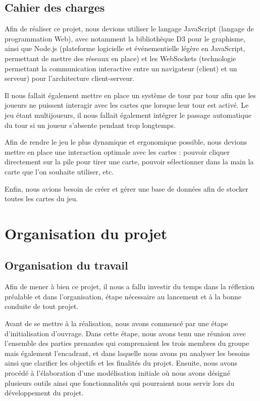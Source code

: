 \documentclass[12pt]{report}
\begin{document}
  	\section*{Cahier des charges}
  	Afin de réaliser ce projet, nous devions utiliser le langage JavaScript (langage de programmation Web), avec notamment la bibliothèque D3 pour le graphisme, ainsi que Node.js (plateforme logicielle et événementielle légère en JavaScript, permettant de mettre des réseaux en place) et les WebSockets (technologie permettant la communication interactive entre un navigateur (client) et un serveur) pour l'architecture client-serveur.

  	Il nous fallait également mettre en place un système de tour par tour afin que les joueurs ne puissent interagir avec les cartes que lorsque leur tour est activé. Le jeu étant multijoueurs, il nous fallait également intégrer le passage automatique du tour si un joueur s'absente pendant trop longtemps.

    Afin de rendre le jeu le plus dynamique et ergonomique possible, nous devions mettre en place une interaction optimale avec les cartes : pouvoir cliquer directement sur la pile pour tirer une carte, pouvoir sélectionner dans la main la carte que l'on souhaite utiliser, etc.

    Enfin, nous avions besoin de créer et gérer une base de données afin de stocker toutes les cartes du jeu.

	\chapter{Organisation du projet}

    \section{Organisation du travail}
		Afin de mener à bien ce projet, il nous a fallu investir du temps dans la réflexion préalable et dans l’organisation, étape nécessaire au lancement et à la bonne conduite de tout projet.

		Avant de se mettre à la réalisation, nous avons commencé par une étape d’initialisation d’ouvrage. Dans cette étape, nous avons tenu une réunion avec l’ensemble des parties prenantes qui comprenaient les trois membres du groupe mais également l’encadrant, et dans laquelle nous avons pu analyser les besoins ainsi que clarifier les objectifs et les finalités du projet.
		Ensuite, nous avons procédé à l’élaboration d'une modélisation initiale où nous avons désigné plusieurs outils ainsi que fonctionnalités qui pourraient nous servir lors du développement du projet.
\end{document}
